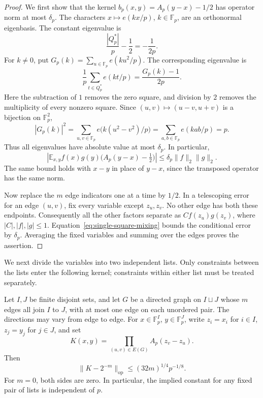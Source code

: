 \begin{proof}
We first show that the kernel
\(b_p(x,y)=A_p(y-x)-1/2\) has operator norm at most \(\delta_p\).
The characters \(x\mapsto e(kx/p)\), \(k\in\mathbb F_p\), are an
orthonormal eigenbasis.  The constant eigenvalue is
\[
 \frac{|Q_p^*|}{p}-\frac12=-\frac1{2p}.
\]
For \(k\ne0\), put \(G_p(k)=\sum_{u\in\mathbb F_p}e(ku^2/p)\).
The corresponding eigenvalue is
\[
 \frac1p\sum_{t\in Q_p^*}e(kt/p)
 =\frac{G_p(k)-1}{2p}.
\]
Here the subtraction of \(1\) removes the zero square, and division
by \(2\) removes the multiplicity of every nonzero square.  Since
\((u,v)\mapsto(u-v,u+v)\) is a bijection on \(\mathbb F_p^2\),
\[
 |G_p(k)|^2
 =\sum_{u,v\in\mathbb F_p}e\bigl(k(u^2-v^2)/p\bigr)
 =\sum_{a,b\in\mathbb F_p}e(kab/p)
 =p.
\]
Thus all eigenvalues have absolute value at most \(\delta_p\).
In particular,
\begin{equation}
 \left|
 \mathbb E_{x,y} f(x)g(y)\bigl(A_p(y-x)-\tfrac12\bigr)
 \right|
 \le\delta_p\|f\|_2\|g\|_2.
 \label{eq:single-square-mixing}
\end{equation}
The same bound holds with \(x-y\) in place of \(y-x\), since the
transposed operator has the same norm.

Now replace the \(m\) edge indicators one at a time by \(1/2\).
In a telescoping error for an edge \((u,v)\), fix every variable
except \(z_u,z_v\).  No other edge has both these endpoints.
Consequently all the other factors separate as
\(C f(z_u)g(z_v)\), where \(|C|,|f|,|g|\le1\).
Equation~\eqref{eq:single-square-mixing} bounds the conditional error
by \(\delta_p\).  Averaging the fixed variables and summing over
the edges proves the assertion.
\end{proof}

We next divide the variables into two independent lists.  Only
constraints between the lists enter the following kernel; constraints
within either list must be treated separately.

\begin{lemma}
\label{lem:list-mixing}
Let \(I,J\) be finite disjoint sets, and let \(G\) be a directed graph
on \(I\sqcup J\) whose \(m\) edges all join \(I\) to \(J\), with at
most one edge on each unordered pair.  The directions may vary from
edge to edge.  For
\(x\in\mathbb F_p^I\), \(y\in\mathbb F_p^J\), write \(z_i=x_i\) for
\(i\in I\), \(z_j=y_j\) for \(j\in J\), and set
\[
 K(x,y)=\prod_{(u,v)\in E(G)}A_p(z_v-z_u).
\]
Then
\begin{equation}
 \|K-2^{-m}\|_{\mathrm{op}}
 \le (32m)^{1/4}p^{-1/8}.
 \label{eq:list-mixing}
\end{equation}
For \(m=0\), both sides are zero.  In particular, the implied
constant for any fixed pair of lists is independent of \(p\).
\end{lemma}

